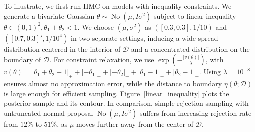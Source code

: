 \documentclass[10pt]{article}
\newcommand{\mc}[1]{\mathcal{#1}}
\DeclareMathOperator{\No}{No}
\DeclareMathOperator{\1}{\mathbbm{1}}
\begin{document}
To illustrate, we first run HMC on models with inequality constraints. We generate a bivariate Gaussian $\theta \sim \No \left( \mu, I\sigma^2\right)$ subject to linear inequality $\theta\in(0,1)^2,\theta_1+\theta_2<1$. We choose $(\mu, \sigma^2)$ as $([0.3,0.3],1/{10})$ and $([0.7,0.3]',1/10^4)$ in two separate settings, inducing a wide-spread distribution centered in the interior of $\mc D$ and a concentrated distribution on the boundary of $\mc D$. For constraint relaxation, we use $\exp(-\frac{|v(\theta)|}{\lambda})$, with $v(\theta)=|\theta_1+\theta_2-1|_+ + |-\theta_1|_+ + |-\theta_2|_ + + |\theta_1-1|_+ + |\theta_2-1|_+$. Using $\lambda=10^{-8}$ ensures almost no approximation error, while the distance to boundary $\eta(\theta;\mc D)$ is large enough for efficient sampling. Figure~\ref{linear_inequality} plots the posterior sample and its contour. In comparison, simple rejection sampling with untruncated normal proposal $\No ( \mu, I\sigma^2)$ suffers from increasing rejection rate from $12\%$ to $51\%$, as $\mu$ moves further away from the center of $\mc D$.
\end{document}
